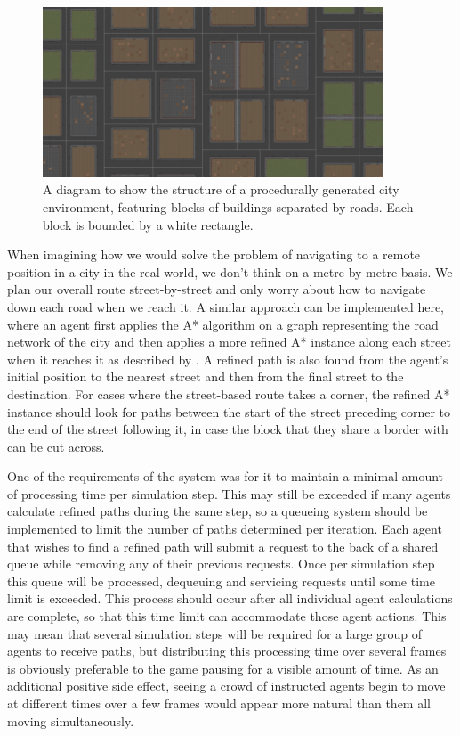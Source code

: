 \documentclass[12pt,a4paper]{article}
\begin{document}
\label{sec:paths}
\begin{figure}[h]
\centering
\includegraphics[width=0.9\textwidth]{blocks}
\caption{A diagram to show the structure of a procedurally generated city environment, featuring blocks of buildings separated by roads. Each block is bounded by a white rectangle.}
\label{fig:block}
\end{figure}

When imagining how we would solve the problem of navigating to a remote position in a city in the real world, we don't think on a metre-by-metre basis. We plan our overall route street-by-street and only worry about how to navigate down each road when we reach it. A similar approach can be implemented here, where an agent first applies the A* algorithm on a graph representing the road network of the city and then applies a more refined A* instance along each street when it reaches it as described by  \citeyear{buro05}. A refined path is also found from the agent's initial position to the nearest street and then from the final street to the destination. For cases where the street-based route takes a corner, the refined A* instance should look for paths between the start of the street preceding corner to the end of the street following it, in case the block that they share a border with can be cut across.

One of the requirements of the system was for it to maintain a minimal amount of processing time per simulation step. This may still be exceeded if many agents calculate refined paths during the same step, so a queueing system should be implemented to limit the number of paths determined per iteration. Each agent that wishes to find a refined path will submit a request to the back of a shared queue while removing any of their previous requests. Once per simulation step this queue will be processed, dequeuing and servicing requests until some time limit is exceeded. This process should occur after all individual agent calculations are complete, so that this time limit can accommodate those agent actions. This may mean that several simulation steps will be required for a large group of agents to receive paths, but distributing this processing time over several frames is obviously preferable to the game pausing for a visible amount of time. As an additional positive side effect, seeing a crowd of instructed agents begin to move at different times over a few frames would appear more natural than them all moving simultaneously.
\end{document}
